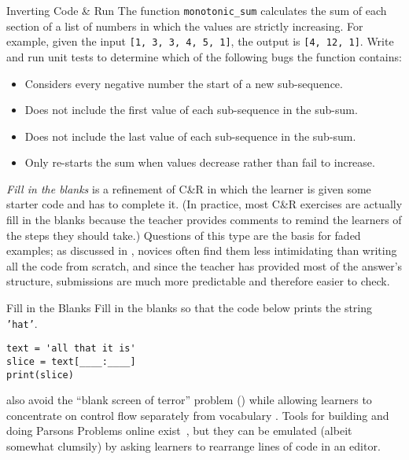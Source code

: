 \begin{aside}{Inverting Code \& Run}
  The function \texttt{monotonic\_sum} calculates the sum of each section
  of a list of numbers in which the values are strictly increasing.
  For example,
  given the input \texttt{[1,\ 3,\ 3,\ 4,\ 5,\ 1]},
  the output is \texttt{[4,\ 12,\ 1]}.
  Write and run unit tests to determine which of the following bugs the function contains:

  \begin{itemize}
  \item
    Considers every negative number the start of a new sub-sequence.
  \item
    Does not include the first value of each sub-sequence in the sub-sum.
  \item
    Does not include the last value of each sub-sequence in the sub-sum.
  \item
    Only re-starts the sum when values decrease rather than fail to increase.
  \end{itemize}
\end{aside}

\emph{Fill in the blanks} is a refinement of C\&R
in which the learner is given some starter code and has to complete it.
(In practice, most C\&R exercises are actually fill in the blanks
because the teacher provides comments
to remind the learners of the steps they should take.)
Questions of this type are the basis for faded examples;
as discussed in ,
novices often find them less intimidating than writing all the code from scratch,
and since the teacher has provided most of the answer's structure,
submissions are much more predictable and therefore easier to check.

\begin{aside}{Fill in the Blanks}
  Fill in the blanks
  so that the code below prints the string \texttt{'hat'}.

\begin{verbatim}
text = 'all that it is'
slice = text[____:____]
print(slice)
\end{verbatim}
\end{aside}

 also avoid
the ``blank screen of terror'' problem ()
while allowing learners to concentrate on control flow separately from vocabulary
\cite{Pars2006,Eric2015,Morr2016,Eric2017}.
Tools for building and doing Parsons Problems online exist~\cite{Ihan2011},
but they can be emulated (albeit somewhat clumsily)
by asking learners to rearrange lines of code in an editor.

